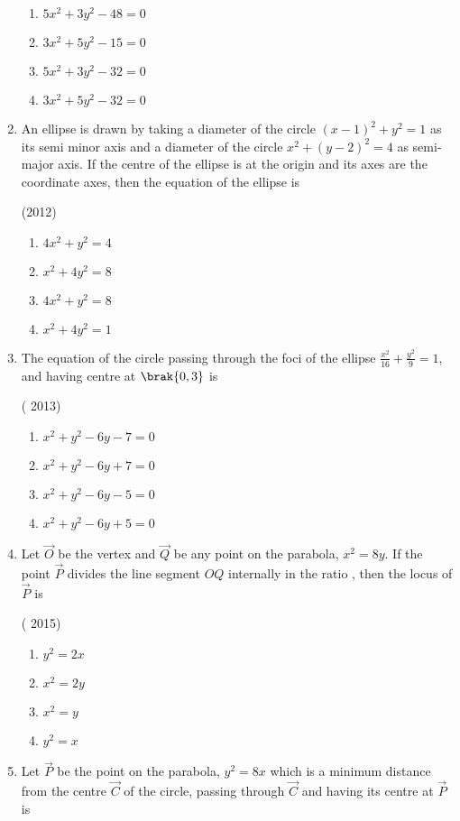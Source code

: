 \begin{enumerate}
	\begin{multicols}{2}
\begin{enumerate}
    \item $5x^2+3y^2-48=0$
    \item $3x^2+5y^2-15=0$
    \item $5x^2+3y^2-32=0$
    \item $3x^2+5y^2-32=0$
\end{enumerate}\end{multicols}
\item An ellipse is drawn by taking a diameter of the circle $(x-1)^2+y^2=1$ as its semi minor axis and a diameter of the circle $x^2+(y-2)^2=4$ as semi-major axis. If the centre of the ellipse is at the origin and its axes are the coordinate axes, then the equation of the ellipse is 

\hfill(2012)
		\begin{multicols}{2}
\begin{enumerate}
    \item $4x^2+y^2=4$ 
    \item $x^2+4y^2=8$
    \item $4x^2+y^2=8$
    \item $x^2+4y^2=1$
\end{enumerate}\end{multicols}
\item The equation of the circle passing through the foci of the ellipse $\frac{x^2}{16}+\frac{y^2}{9}=1$, and having centre at $\brak{0,3}$ is

\hfill( 2013)
			\begin{multicols}{2}
\begin{enumerate}
    \item $x^2+y^2-6y-7=0$
    \item $x^2+y^2-6y+7=0$
    \item $x^2+y^2-6y-5=0$
    \item $x^2+y^2-6y+5=0$
\end{enumerate}\end{multicols}
\item Let $\vec{O}$ be the vertex and $\vec{Q}$ be any point on the parabola, $x^2=8y$. If the point $\vec{P}$ divides the line segment $OQ$ internally in the ratio , then the locus of $\vec{P}$ is

\hfill( 2015)
				\begin{multicols}{4}
\begin{enumerate}
    \item $y^2=2x$
    \item $x^2=2y$
    \item $x^2=y$
    \item $y^2=x$
\end{enumerate}\end{multicols}
\item Let $\vec{P}$ be the point on the parabola, $y^2=8x$ which is a minimum distance from the centre $\vec{C}$ of the circle, passing through $\vec{C}$ and having its centre at $\vec{P}$ is


\end{enumerate}
